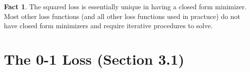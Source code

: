 \documentclass[10pt]{exam}
\theoremstyle{definition}
\newtheorem{problem}{Problem}
\newtheorem{note}{Note}
\newtheorem{fact}{Fact}
\newcommand{\x}{\mathbf x}
\begin{document}


\newpage
\begin{fact}
The squared loss is essentially unique in having a closed form minimizer.
Most other loss functions (and all other loss functions used in practuce) do not have closed form minimizers and require iterative procedures to solve.
\end{fact}

\section*{The 0-1 Loss (Section 3.1)}
\end{document}

